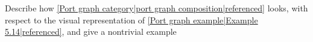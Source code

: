 
Describe how \ref{Port graph category|port graph composition|referenced} looks, with respect to the visual representation of \ref{Port graph example|Example 5.14|referenced}, and give a nontrivial example